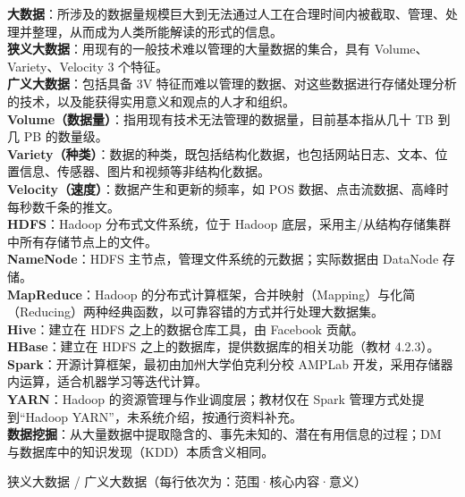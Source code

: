 \documentclass[a4paper,11pt]{article}
\begin{document}
\begin{keyterms}
\textbf{大数据}：所涉及的数据量规模巨大到无法通过人工在合理时间内被截取、管理、处理并整理，从而成为人类所能解读的形式的信息。\\
\textbf{狭义大数据}：用现有的一般技术难以管理的大量数据的集合，具有 Volume、Variety、Velocity 3 个特征。\\
\textbf{广义大数据}：包括具备 3V 特征而难以管理的数据、对这些数据进行存储处理分析的技术，以及能获得实用意义和观点的人才和组织。\\
\textbf{Volume（数据量）}：指用现有技术无法管理的数据量，目前基本指从几十 TB 到几 PB 的数量级。\\
\textbf{Variety（种类）}：数据的种类，既包括结构化数据，也包括网站日志、文本、位置信息、传感器、图片和视频等非结构化数据。\\
\textbf{Velocity（速度）}：数据产生和更新的频率，如 POS 数据、点击流数据、高峰时每秒数千条的推文。\\
\textbf{HDFS}：Hadoop 分布式文件系统，位于 Hadoop 底层，采用主/从结构存储集群中所有存储节点上的文件。\\
\textbf{NameNode}：HDFS 主节点，管理文件系统的元数据；实际数据由 DataNode 存储。\\
\textbf{MapReduce}：Hadoop 的分布式计算框架，合并映射（Mapping）与化简（Reducing）两种经典函数，以可靠容错的方式并行处理大数据集。\\
\textbf{Hive}：建立在 HDFS 之上的数据仓库工具，由 Facebook 贡献。\\
\textbf{HBase}：建立在 HDFS 之上的数据库，提供数据库的相关功能（教材 4.2.3）。\\
\textbf{Spark}：开源计算框架，最初由加州大学伯克利分校 AMPLab 开发，采用存储器内运算，适合机器学习等迭代计算。\\
\textbf{YARN}：Hadoop 的资源管理与作业调度层；教材仅在 Spark 管理方式处提到“Hadoop YARN”，未系统介绍，按通行资料补充。\\
\textbf{数据挖掘}：从大量数据中提取隐含的、事先未知的、潜在有用信息的过程；DM 与数据库中的知识发现（KDD）本质含义相同。
\end{keyterms}

\begin{contrast}{狭义大数据 / 广义大数据（每行依次为：范围·核心内容·意义）}
\end{contrast}
\end{document}
